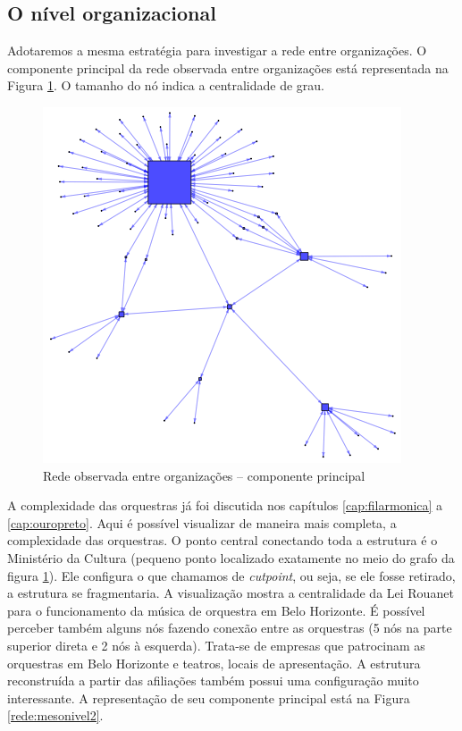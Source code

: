 \documentclass[a4paper, 12pt, openright, oneside, german, french, english, brazil]{abntex2}
\begin{document}
		
	\subsection{O nível organizacional}
	
	Adotaremos a mesma estratégia para investigar a rede entre organizações. O componente principal da rede observada entre organizações está representada na Figura \ref{rede:organizacoes}. O tamanho do nó indica a centralidade de grau.
	
	
	\begin{figure}[ht]
		\centering
		\caption{Rede observada entre organizações -- componente principal}
		\label{rede:organizacoes}
		\includegraphics[scale=.7]{nivel2.png}
	\end{figure}
	
	A complexidade das orquestras já foi discutida nos capítulos \ref{cap:filarmonica} a \ref{cap:ouropreto}. Aqui é possível visualizar de maneira mais completa, a complexidade das orquestras. O ponto central conectando toda a estrutura é o Ministério da Cultura (pequeno ponto localizado exatamente no meio do grafo da figura \ref{rede:organizacoes}). Ele configura o que chamamos de \textit{cutpoint}, ou seja, se ele fosse retirado, a estrutura se fragmentaria. A visualização mostra a centralidade da Lei Rouanet para o funcionamento da música de orquestra em Belo Horizonte. É possível perceber também alguns nós fazendo conexão entre as orquestras (5 nós na parte superior direta e 2 nós à esquerda). Trata-se de empresas que patrocinam as orquestras em Belo Horizonte e teatros, locais de apresentação. A estrutura reconstruída a partir das afiliações também possui uma configuração muito interessante. A representação de seu componente principal está na Figura \ref{rede:mesonivel2}.
	
\end{document}
